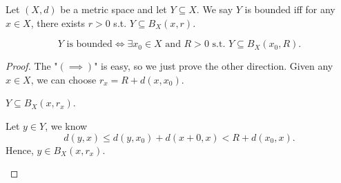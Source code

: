 \begin{definition}[Bounded] \label{def: bounded}
    Let \((X, d)\) be a metric space and let \(Y \subseteq X\). We say \(Y\) is bounded iff for any \(x \in X\), there exists \(r > 0\) s.t. \(Y \subseteq B_X(x, r)\).      
\end{definition}

\begin{theorem}
    \[
        Y \text{ is bounded} \iff \exists x_0 \in X \text{ and } R > 0 \text{ s.t. } Y \subseteq B_X(x_0, R).
    \]
\end{theorem}
\begin{proof}
    The "\((\implies) \)" is easy, so we just prove the other direction. Given any \(x \in X\), we can choose \(r_x = R + d(x, x_0)\). 
    \begin{claim}
        \(Y \subseteq B_X(x, r_x)\). 
    \end{claim}  
    \begin{explanation}
        Let \(y \in Y\), we know 
        \[
            d(y, x) \le d(y, x_0) + d(x+0, x) < R + d(x_0, x).
        \] 
        Hence, \(y \in B_X(x, r_x)\).  
    \end{explanation}
\end{proof}

